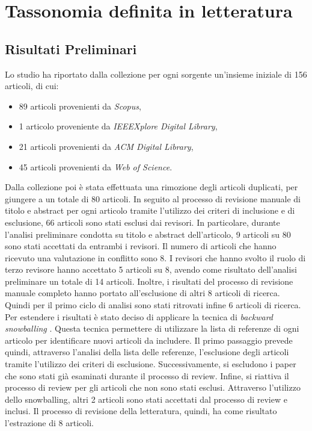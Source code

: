 \section{Tassonomia definita in letteratura}
\subsection{Risultati Preliminari}
Lo studio ha riportato dalla collezione per ogni sorgente un'insieme iniziale di 156 articoli, di cui:
\begin{itemize}
    \item 89 articoli provenienti da \textit{Scopus},
    \item 1 articolo proveniente da \textit{IEEEXplore Digital Library},
    \item 21 articoli provenienti da \textit{ACM Digital Library},
    \item 45 articoli provenienti da \textit{Web of Science}.
\end{itemize}
Dalla collezione poi è stata effettuata una rimozione degli articoli duplicati, per giungere a un totale di 80 articoli.
In seguito al processo di revisione manuale di titolo e abstract per ogni articolo tramite l'utilizzo dei criteri di inclusione e di esclusione, 66 articoli sono stati esclusi dai revisori.
In particolare, durante l'analisi preliminare condotta su titolo e abstract dell'articolo, 
9 articoli su 80 sono stati accettati da entrambi i revisori.
Il numero di articoli che hanno ricevuto una valutazione in conflitto sono 8.
I revisori che hanno svolto il ruolo di terzo revisore hanno accettato 5 articoli su 8, avendo come risultato dell'analisi preliminare un totale di 14 articoli.
Inoltre, i risultati del processo di revisione manuale completo hanno portato all'esclusione di altri 8 articoli di ricerca.
Quindi per il primo ciclo di analisi sono stati ritrovati infine 6 articoli di ricerca.
Per estendere i risultati è stato deciso di applicare la tecnica di \textit{backward snowballing} \cite{WohlinSnowballing}.
 Questa tecnica permettere di utilizzare la lista di referenze di ogni articolo per identificare nuovi articoli da includere.
 Il primo passaggio prevede quindi, attraverso l'analisi della lista delle referenze, l'esclusione degli articoli tramite l'utilizzo dei criteri di esclusione.
 Successivamente, si escludono i paper che sono stati già esaminati durante il processo di review. Infine, si riattiva il processo di review per gli articoli che non sono stati esclusi.
 Attraverso l'utilizzo dello snowballing, altri 2 articoli sono stati accettati dal processo di review e inclusi.
 Il processo di revisione della letteratura, quindi, ha come risultato l'estrazione di 8 articoli.
 
